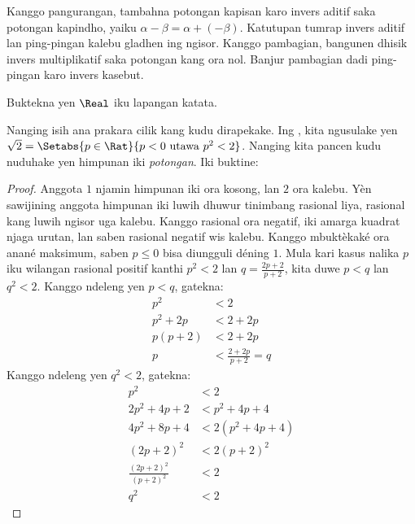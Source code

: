 \documentclass[../../../include/open-logic-section]{subfiles}
\begin{document}
Kanggo pangurangan, tambahna potongan kapisan karo invers aditif
saka potongan kapindho, yaiku $\alpha - \beta = \alpha + (-\beta)$.
Katutupan tumrap invers aditif lan ping-pingan kalebu gladhen ing ngisor.
Kanggo pambagian, bangunen dhisik invers multiplikatif saka potongan kang ora nol.
Banjur pambagian dadi ping-pingan karo invers kasebut.

\begin{prob}
Buktekna yen $\Real$ iku lapangan katata.
\end{prob}

Nanging isih ana prakara cilik kang kudu dirapekake. Ing
, kita ngusulake yen $\sqrt{2} =
\Setabs{p \in \Rat}{p < 0 \text{ utawa }p^2 < 2}$. Nanging kita pancen
kudu nuduhake yen himpunan iki \emph{potongan}. Iki buktine:

\begin{proof}
Anggota $1$ njamin himpunan iki ora kosong, lan $2$ ora kalebu.
Yèn sawijining anggota himpunan iki luwih dhuwur tinimbang rasional
liya, rasional kang luwih ngisor uga kalebu. Kanggo rasional ora negatif,
iki amarga kuadrat njaga urutan, lan saben rasional negatif wis kalebu.
Kanggo mbuktèkaké ora anané maksimum, saben $p\leq 0$ bisa
diungguli déning $1$. Mula kari kasus nalika $p$ iku wilangan rasional positif kanthi $p^2 < 2$ lan $q =
\frac{2p+2}{p+2}$, kita duwe $p < q$ lan $q^2 < 2$. Kanggo ndeleng yen
$p < q$, gatekna:
\begin{align*}
	p^2 &< 2\\
	p^2 + 2p &< 2 + 2p\\
	p(p + 2) &< 2 + 2p\\
	p &< \tfrac{2+2p}{p+2} = q
\end{align*}
Kanggo ndeleng yen $q^2 < 2$, gatekna:
\begin{align*}
	p^2 &< 2\\
	2p^2 + 4p + 2 &< p^2 + 4p+ 4\\
	4p^2 + 8p + 4 &< 2(p^2 + 4p + 4)\\
	(2p+2)^2 & <2(p+2)^2\\
	\tfrac{(2p+2)^2}{(p+2)^2} &< 2\\
	q^2 &< 2
\end{align*}
\end{proof}
\end{document}
